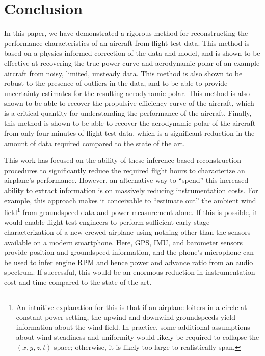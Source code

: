 \documentclass[conf]{new-aiaa}
\begin{document}
    \section{Conclusion}
    \label{sec:conclusion}

    In this paper, we have demonstrated a rigorous method for reconstructing the performance characteristics of an aircraft from flight test data. This method is based on a physics-informed correction of the data and model, and is shown to be effective at recovering the true power curve and aerodynamic polar of an example aircraft from noisy, limited, unsteady data. This method is also shown to be robust to the presence of outliers in the data, and to be able to provide uncertainty estimates for the resulting aerodynamic polar. This method is also shown to be able to recover the propulsive efficiency curve of the aircraft, which is a critical quantity for understanding the performance of the aircraft. Finally, this method is shown to be able to recover the aerodynamic polar of the aircraft from only four minutes of flight test data, which is a significant reduction in the amount of data required compared to the state of the art.

    This work has focused on the ability of these inference-based reconstruction procedures to significantly reduce the required flight hours to characterize an airplane's performance. However, an alternative way to ``spend'' this increased ability to extract information is on massively reducing instrumentation costs. For example, this approach makes it conceivable to ``estimate out'' the ambient wind field\footnote{An intuitive explanation for this is that if an airplane loiters in a circle at constant power setting, the upwind and downwind groundspeeds yield information about the wind field. In practice, some additional assumptions about wind steadiness and uniformity would likely be required to collapse the $(x, y, z, t)$ space; otherwise, it is likely too large to realistically span.} from groundspeed data and power measurement alone. If this is possible, it would enable flight test engineers to perform sufficient early-stage characterization of a new crewed airplane using nothing other than the sensors available on a modern smartphone. Here, GPS, IMU, and barometer sensors provide position and groundspeed information, and the phone's microphone can be used to infer engine RPM and hence power and advance ratio from an audio spectrum. If successful, this would be an enormous reduction in instrumentation cost and time compared to the state of the art.
\end{document}

